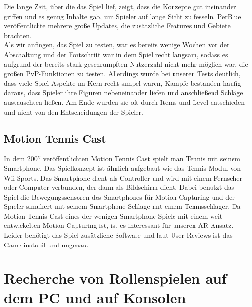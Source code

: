 \documentclass[extern,palatino]{cgBA}
\begin{document}
	Die lange Zeit, über die das Spiel lief, zeigt, dass die Konzepte gut ineinander griffen und es genug Inhalte gab, um Spieler auf lange Sicht zu fesseln. PerBlue veröffentlichte mehrere große Updates, die zusätzliche Features und Gebiete brachten.\\ Als wir anfingen, das Spiel zu testen, war es bereits wenige Wochen vor der Abschaltung und der Fortschritt war in dem Spiel recht langsam, sodass es aufgrund der bereits stark geschrumpften Nutzerzahl nicht mehr möglich war, die großen PvP-Funktionen zu testen. Allerdings wurde bei unseren Tests deutlich, dass viele Spiel-Aspekte im Kern recht simpel waren, Kämpfe bestanden häufig daraus, dass Spieler ihre Figuren nebeneinander liefen und anschließend Schläge austauschten ließen. Am Ende wurden sie oft durch Items und Level entschieden und nicht von den Entscheidungen der Spieler. 
	\subsection{Motion Tennis Cast}\label{mtc}
	In dem 2007 veröffentlichten Motion Tennis Cast spielt man Tennis mit seinem Smartphone. Das Spielkonzept ist ähnlich aufgebaut wie das Tennis-Modul von Wii Sports. Das Smartphone dient als Controller und wird mit einem Fernseher oder Computer verbunden, der dann als Bildschirm dient. Dabei benutzt das Spiel die Bewegungssensoren des Smartphones für Motion Capturing und der Spieler simuliert mit seinem Smartphone Schläge mit einem Tennisschläger. Da Motion Tennis Cast eines der wenigen Smartphone Spiele mit einem weit entwickelten Motion Capturing ist, ist es interessant für unseren AR-Ansatz. Leider benötigt das Spiel zusätzliche Software und laut User-Reviews ist das Game instabil und ungenau.
	\newpage
	
	\section{Recherche von Rollenspielen auf dem PC und auf Konsolen}
	
\end{document}
